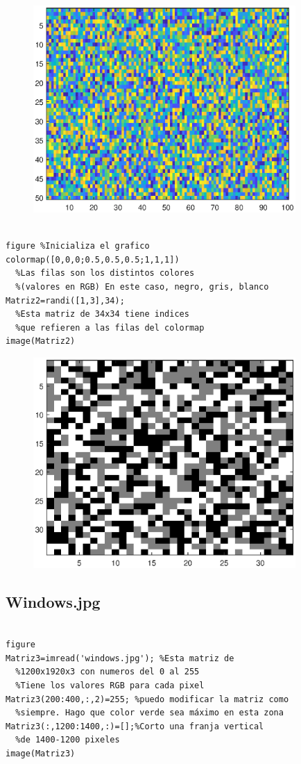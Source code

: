 \documentclass[11pt, a4paper,titlepage]{article}
\begin{document}
\begin{figure}[h]
\centering
\includegraphics[width=10cm]{graf/g4_1.eps}
\end{figure}

\begin{code}
\begin{verbatim}

figure %Inicializa el grafico
colormap([0,0,0;0.5,0.5,0.5;1,1,1]) 
  %Las filas son los distintos colores
  %(valores en RGB) En este caso, negro, gris, blanco
Matriz2=randi([1,3],34); 
  %Esta matriz de 34x34 tiene indices 
  %que refieren a las filas del colormap
image(Matriz2)
\end{verbatim}
\end{code}
\clearpage
\begin{figure}[h]
\centering
\includegraphics[width=10cm]{graf/g4_2.eps}
\end{figure}
\subsection{Windows.jpg}
\begin{code}
\begin{verbatim}

figure
Matriz3=imread('windows.jpg'); %Esta matriz de
  %1200x1920x3 con numeros del 0 al 255 
  %Tiene los valores RGB para cada pixel
Matriz3(200:400,:,2)=255; %puedo modificar la matriz como
  %siempre. Hago que color verde sea máximo en esta zona
Matriz3(:,1200:1400,:)=[];%Corto una franja vertical
  %de 1400-1200 pixeles
image(Matriz3)

\end{verbatim}
\end{code}
\clearpage
\end{document}

